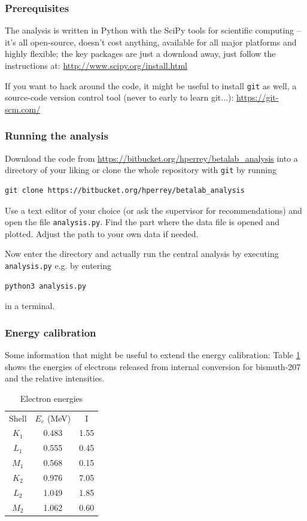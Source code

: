\documentclass[a4,11pt, notitlepage]{article}
\begin{document}
\subsubsection{Prerequisites}
\label{sec:prerequisites}

The analysis is written in Python with the SciPy tools for scientific
computing -- it's all open-source, doesn't cost anything, available
for all major platforms and highly flexible; the key packages are just
a download away, just follow the instructions at: \url{http://www.scipy.org/install.html}

If you want to hack around the code, it might be useful to install
\texttt{git} as well, a source-code version control tool (never to
early to learn git$\ldots$): \url{https://git-scm.com/}

\subsubsection{Running the analysis}
\label{sec:running-analysis}

Download the code from
\url{https://bitbucket.org/hperrey/betalab_analysis} into a directory
of your liking or clone the whole repository with \texttt{git} by running
\begin{verbatim}
git clone https://bitbucket.org/hperrey/betalab_analysis
\end{verbatim}

Use a text editor of your choice (or ask the supervisor for
recommendations) and open the file \texttt{analysis.py}. Find the part
where the data file is opened and plotted. Adjust the path to your own
data if needed.

Now enter the directory and actually run the central analysis by executing \texttt{analysis.py} e.g. by
entering
\begin{verbatim}
python3 analysis.py
\end{verbatim}
in a terminal.

\subsubsection{Energy calibration}
\label{sec:energy-calib}

Some information that might be useful to extend the energy
calibration: Table \ref{tab:calib} shows the energies of electrons released from
internal conversion for bismuth-207 and the relative intensities.

\begin{table}[]
\caption{Electron energies}
\label{tab:calib}
\centering
\begin{tabular}{ccc}
Shell & $E_{e}$ (MeV) & I \\
$K_1$ & 0.483 & 1.55 \\
$L_1$ & 0.555 & 0.45 \\
$M_1$ & 0.568 & 0.15 \\
$K_2$ & 0.976 & 7.05 \\
$L_2$ & 1.049 & 1.85 \\
$M_2$ & 1.062 & 0.60 
\end{tabular}
\end{table}
\end{document}
